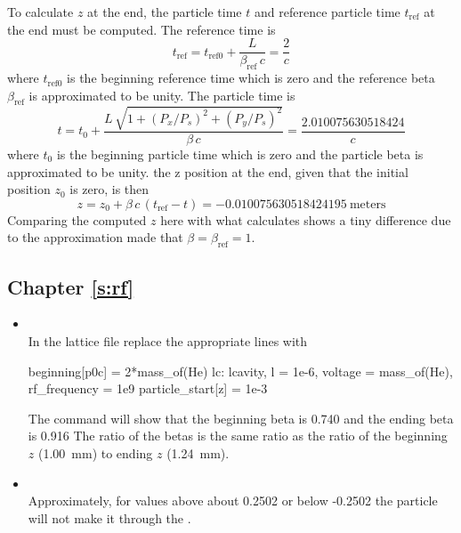 \documentclass{hitec}     %
\begin{document}
{{{{\begin{itemize}[leftmargin=*]
To calculate $z$ at the end, the particle time $t$ and reference particle time $t_\text{ref}$ at the end must be computed.
The reference time is
\begin{equation}
  t_\text{ref} = t_\text{ref0} + \frac{L}{\beta_\text{ref} \, c} = \frac{2}{c}
\end{equation}
where $t_\text{ref0}$ is the beginning reference time which is zero and
the reference beta $\beta_\text{ref}$ is approximated to be unity.
The particle time is
\begin{equation}
    t = t_0 + \frac{L \, \sqrt{1 + (P_x/P_s)^2 + (P_y/P_s)^2}}{\beta \, c} = \frac{2.010075630518424}{c}
\end{equation}
where $t_0$ is the beginning particle time which is zero and the particle beta is approximated to be unity.
the z position at the end, given that the initial position $z_0$ is zero, is then
\begin{equation}
    z = z_0 + \beta \, c \, (t_\text{ref} - t) = -0.010075630518424195~\text{meters}
\end{equation}
Comparing the computed $z$ here with what \bmad calculates shows a tiny difference due to the approximation made that
$\beta = \beta_\text{ref} = 1$.
\end{itemize}

\subsection{Chapter \ref{s:rf}}   %

\begin{itemize}[leftmargin=*]
%
\item[]\hspace*{-24pt} \\
In the  lattice file replace the appropriate lines with
\begin{code}
beginning[p0c] = 2*mass_of(He)
lc: lcavity, l = 1e-6, voltage = mass_of(He), rf_frequency = 1e9
particle_start[z] = 1e-3
\end{code}
The command  will show that the beginning beta is 0.740 and the ending beta is 0.916
The ratio of the betas is the same ratio as the ratio of the beginning $z$ (1.00~mm) to ending $z$
(1.24~mm).
%
\item[]\hspace*{-24pt} \\
Approximately, for  values above about 0.2502 or below -0.2502 the particle will not
make it through the .
\end{itemize}


}}}}
\end{document}
